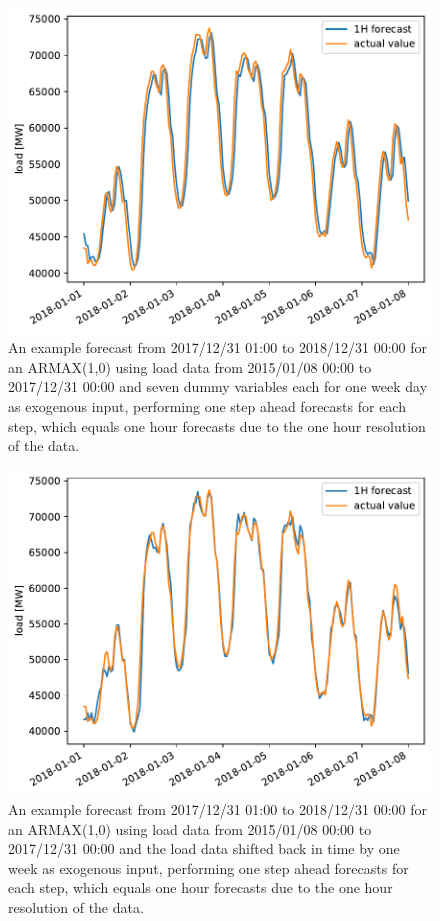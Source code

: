 \begin{figure}[h!]%
\centering
\includegraphics[width=\textwidth]{plots/ARMAXfc/ARMAX_p1q0_data2015to2017_fcto2018123100_dayofweek_plot_range2018010100_2018010800}%
\caption{An example forecast from 2017/12/31 01:00 to 2018/12/31 00:00 for an ARMAX(1,0) using load data from 2015/01/08 00:00 to 2017/12/31 00:00 and seven dummy variables each for one week day as exogenous input, performing one step ahead forecasts for each step, which equals one hour forecasts due to the one hour resolution of the data.}%
\label{fig:armax_fc_dayofweek}%
\end{figure}

\begin{figure}[h!]%
\centering
\includegraphics[width=\textwidth]{plots/ARMAXfc/ARMAX_p1q0_data2015to2017_fcto2018123100_load_lag_plot_range2018010100_2018010800.pdf}%
\caption{An example forecast from 2017/12/31 01:00 to 2018/12/31 00:00 for an ARMAX(1,0) using load data from 2015/01/08 00:00 to 2017/12/31 00:00 and the load data shifted back in time by one week as exogenous input, performing one step ahead forecasts for each step, which equals one hour forecasts due to the one hour resolution of the data.}%
\label{fig:armax_fc_load_lag}%
\end{figure}

